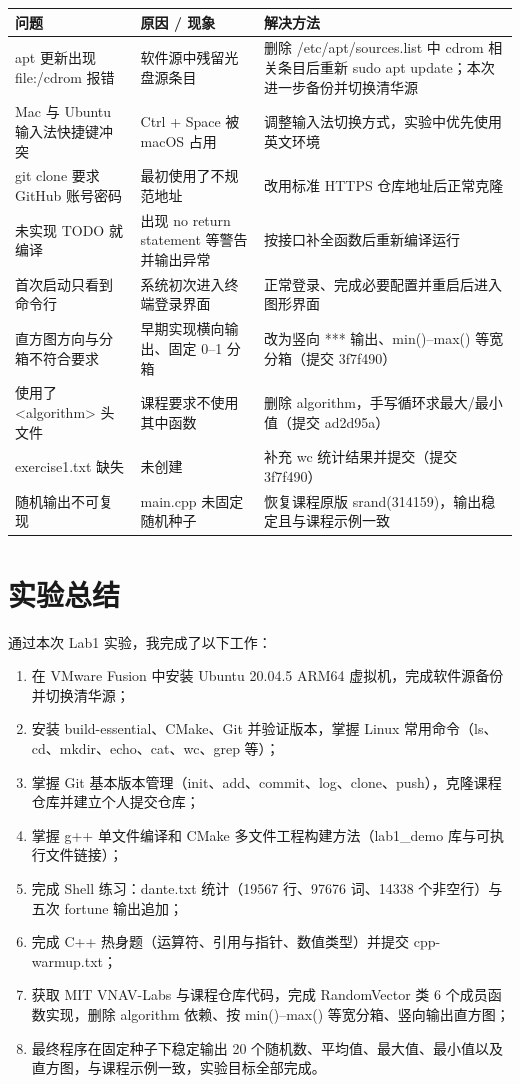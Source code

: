 \documentclass[12pt,a4paper]{ctexart}
\begin{document}
\begin{center}
\begin{tabular}{p{4.6cm}p{4.2cm}p{6.2cm}}
\toprule
问题 & 原因 / 现象 & 解决方法 \\
\midrule
apt 更新出现 file:/cdrom 报错 & 软件源中残留光盘源条目 & 删除 /etc/apt/sources.list 中 cdrom 相关条目后重新 sudo apt update；本次进一步备份并切换清华源 \\
Mac 与 Ubuntu 输入法快捷键冲突 & Ctrl + Space 被 macOS 占用 & 调整输入法切换方式，实验中优先使用英文环境 \\
git clone 要求 GitHub 账号密码 & 最初使用了不规范地址 & 改用标准 HTTPS 仓库地址后正常克隆 \\
未实现 TODO 就编译 & 出现 no return statement 等警告并输出异常 & 按接口补全函数后重新编译运行 \\
首次启动只看到命令行 & 系统初次进入终端登录界面 & 正常登录、完成必要配置并重启后进入图形界面 \\
直方图方向与分箱不符合要求 & 早期实现横向输出、固定 0--1 分箱 & 改为竖向 *** 输出、min()--max() 等宽分箱（提交 3f7f490） \\
使用了 <algorithm> 头文件 & 课程要求不使用其中函数 & 删除 algorithm，手写循环求最大/最小值（提交 ad2d95a） \\
exercise1.txt 缺失 & 未创建 & 补充 wc 统计结果并提交（提交 3f7f490） \\
随机输出不可复现 & main.cpp 未固定随机种子 & 恢复课程原版 srand(314159)，输出稳定且与课程示例一致 \\
\bottomrule
\end{tabular}
\end{center}

\newpage

\section{实验总结}

通过本次 Lab1 实验，我完成了以下工作：
\begin{enumerate}[itemsep=1pt]
\item 在 VMware Fusion 中安装 Ubuntu 20.04.5 ARM64 虚拟机，完成软件源备份并切换清华源；
\item 安装 build-essential、CMake、Git 并验证版本，掌握 Linux 常用命令（ls、cd、mkdir、echo、cat、wc、grep 等）；
\item 掌握 Git 基本版本管理（init、add、commit、log、clone、push），克隆课程仓库并建立个人提交仓库；
\item 掌握 g++ 单文件编译和 CMake 多文件工程构建方法（lab1\_demo 库与可执行文件链接）；
\item 完成 Shell 练习：dante.txt 统计（19567 行、97676 词、14338 个非空行）与五次 fortune 输出追加；
\item 完成 C++ 热身题（运算符、引用与指针、数值类型）并提交 cpp-warmup.txt；
\item 获取 MIT VNAV-Labs 与课程仓库代码，完成 RandomVector 类 6 个成员函数实现，删除 algorithm 依赖、按 min()--max() 等宽分箱、竖向输出直方图；
\item 最终程序在固定种子下稳定输出 20 个随机数、平均值、最大值、最小值以及直方图，与课程示例一致，实验目标全部完成。
\end{enumerate}
\end{document}

